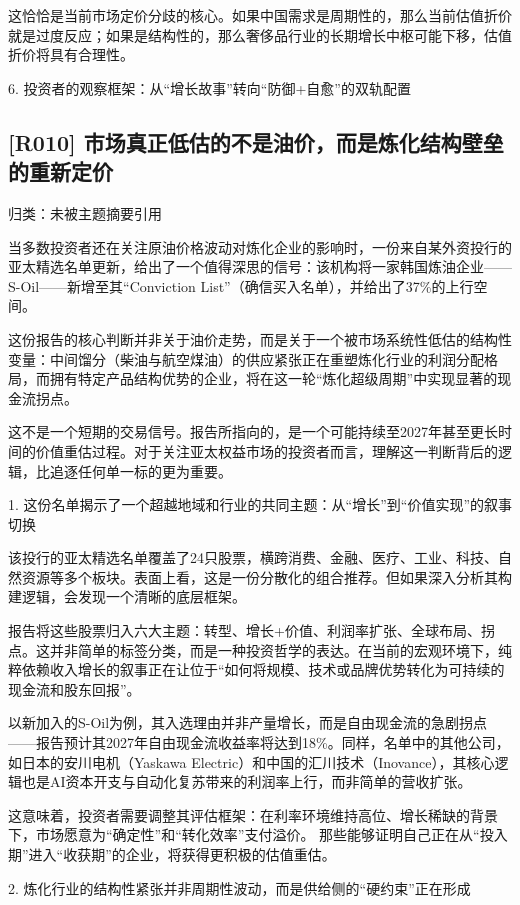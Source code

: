 \documentclass[11pt]{ctexart}
\begin{document}
这恰恰是当前市场定价分歧的核心。如果中国需求是周期性的，那么当前估值折价就是过度反应；如果是结构性的，那么奢侈品行业的长期增长中枢可能下移，估值折价将具有合理性。

6. 投资者的观察框架：从“增长故事”转向“防御+自愈”的双轨配置

\subsection{[R010] 市场真正低估的不是油价，而是炼化结构壁垒的重新定价}
{\small\color{refgray}归类：未被主题摘要引用}

当多数投资者还在关注原油价格波动对炼化企业的影响时，一份来自某外资投行的亚太精选名单更新，给出了一个值得深思的信号：该机构将一家韩国炼油企业——S-Oil——新增至其“Conviction List”（确信买入名单），并给出了37\%的上行空间。

这份报告的核心判断并非关于油价走势，而是关于一个被市场系统性低估的结构性变量：中间馏分（柴油与航空煤油）的供应紧张正在重塑炼化行业的利润分配格局，而拥有特定产品结构优势的企业，将在这一轮“炼化超级周期”中实现显著的现金流拐点。

这不是一个短期的交易信号。报告所指向的，是一个可能持续至2027年甚至更长时间的价值重估过程。对于关注亚太权益市场的投资者而言，理解这一判断背后的逻辑，比追逐任何单一标的更为重要。

1. 这份名单揭示了一个超越地域和行业的共同主题：从“增长”到“价值实现”的叙事切换

该投行的亚太精选名单覆盖了24只股票，横跨消费、金融、医疗、工业、科技、自然资源等多个板块。表面上看，这是一份分散化的组合推荐。但如果深入分析其构建逻辑，会发现一个清晰的底层框架。

报告将这些股票归入六大主题：转型、增长+价值、利润率扩张、全球布局、拐点。这并非简单的标签分类，而是一种投资哲学的表达。在当前的宏观环境下，纯粹依赖收入增长的叙事正在让位于“如何将规模、技术或品牌优势转化为可持续的现金流和股东回报”。

以新加入的S-Oil为例，其入选理由并非产量增长，而是自由现金流的急剧拐点——报告预计其2027年自由现金流收益率将达到18\%。同样，名单中的其他公司，如日本的安川电机（Yaskawa Electric）和中国的汇川技术（Inovance），其核心逻辑也是AI资本开支与自动化复苏带来的利润率上行，而非简单的营收扩张。

这意味着，投资者需要调整其评估框架：在利率环境维持高位、增长稀缺的背景下，市场愿意为“确定性”和“转化效率”支付溢价。 那些能够证明自己正在从“投入期”进入“收获期”的企业，将获得更积极的估值重估。

2. 炼化行业的结构性紧张并非周期性波动，而是供给侧的“硬约束”正在形成
\end{document}
